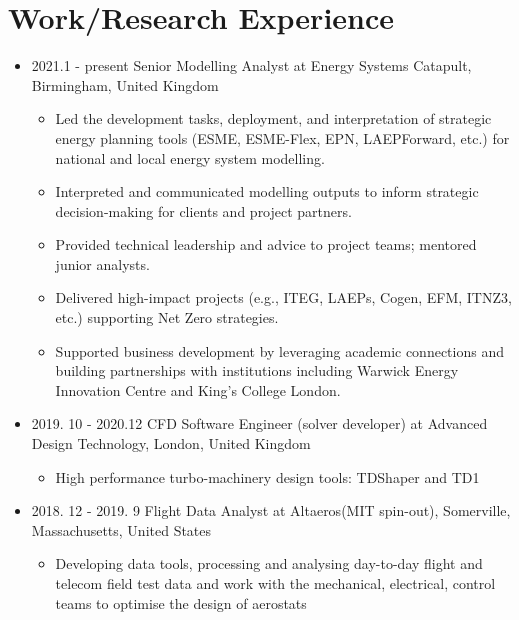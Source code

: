 \documentclass[letterpaper]{article}
\begin{document}
\section*{Work/Research Experience}
\vspace{-10pt}
\begin{itemize}
\item 2021.1 - present \hspace{2pt} Senior Modelling Analyst at Energy Systems Catapult, Birmingham, United Kingdom
  \begin{itemize}
    \item Led the development tasks, deployment, and interpretation of strategic energy planning tools (ESME, ESME-Flex, EPN, LAEPForward, etc.) for national and local energy system modelling.
    \item Interpreted and communicated modelling outputs to inform strategic decision-making for clients and project partners.
    \item Provided technical leadership and advice to project teams; mentored junior analysts.
    \item Delivered high-impact projects (e.g., ITEG, LAEPs, Cogen, EFM, ITNZ3, etc.) supporting Net Zero strategies.
    \item Supported business development by leveraging academic connections and building partnerships with institutions including Warwick Energy Innovation Centre and King's College London.
  \end{itemize}
\item 2019. 10 - 2020.12 \hspace{2pt} CFD Software Engineer (solver developer) at Advanced Design Technology, London, United Kingdom
   \begin{itemize}
   \item High performance turbo-machinery design tools: TDShaper and TD1
   \end{itemize}
\item 2018. 12 - 2019. 9 \hspace{2pt} Flight Data Analyst at Altaeros(MIT spin-out), Somerville, Massachusetts, United States
	\begin{itemize}
	\item Developing data tools,  processing and analysing day-to-day flight and telecom field test data and work with the mechanical, electrical, control teams to optimise the design of aerostats

\end{itemize}
\end{itemize}
\end{document}

